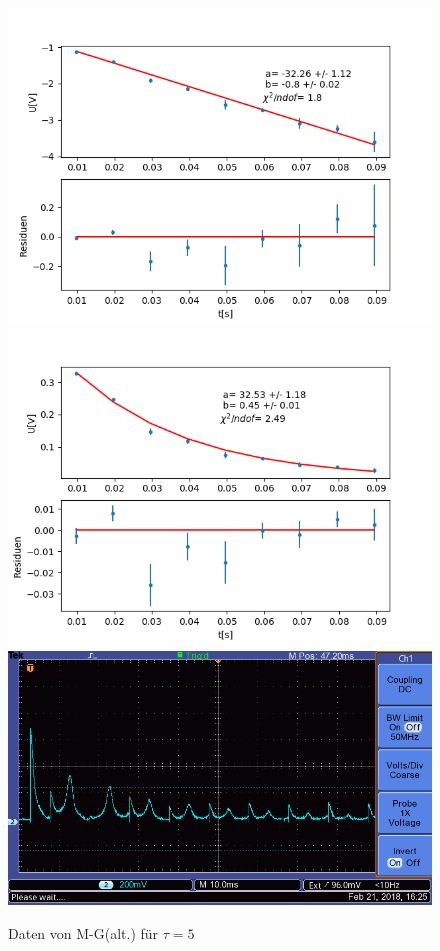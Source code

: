 \documentclass[12pt,a4paper]{article}
\begin{document}
\begin{figure}
\centering
\includegraphics[scale=0.5]{Bilder/T2Anhang/T2log5alt.png}
\includegraphics[scale=0.5]{Bilder/T2Anhang/T2exp5alt.png}
\includegraphics[scale=0.5]{Bilder/T2Anhang/T2plot5alt.png}
\caption{Daten von M-G(alt.) für $\tau = 5$}
\end{figure}
\end{document}
